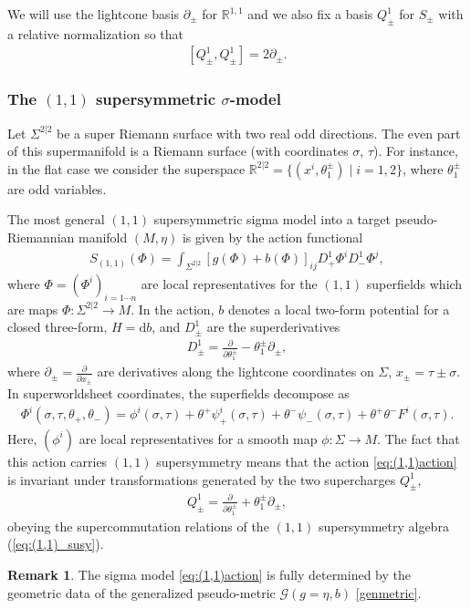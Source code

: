 \documentclass{article}
\newcommand{\GG}{\mathcal{G}}
\newcommand{\RR}{\mathbb{R}}
\newcommand{\p}{\partial}
\newcommand{\rd}{\mathrm{d}}
\theoremstyle{definition}
\newtheorem{remark}[theorem]{Remark}
\theoremstyle{remark}
\begin{document}
We will use the lightcone basis $\p_{\pm}$ for $\RR^{1,1}$ and we also fix a basis $Q_\pm^1$ for $S_{\pm}$ with a relative normalization so that
\begin{align}\label{eq:(1,1)_susy}
[Q^1_\pm,Q^1_\pm] = 2\p_\pm.
\end{align}

\subsubsection{The $(1,1)$ supersymmetric $\sigma$-model} 

Let $\Sigma^{2|2}$ be a super Riemann surface with two real odd directions. 
The even part of this supermanifold is a Riemann surface (with coordinates $\sigma$, $\tau$).
For instance, in the flat case we consider the superspace $\RR^{2|2} = \{(x^i , \theta_1^{\pm}) \; | \; i = 1,2\}$, where $\theta_1^{\pm}$ are odd variables. 

The most general $(1,1)$ supersymmetric sigma model into a target pseudo-Riemannian manifold $(M,\eta)$ is given by the action functional
\begin{align}\label{eq:(1,1)action}
S_{(1,1)}(\Phi)=\int_{\Sigma^{2|2}} [g(\Phi)+b(\Phi)]_{ij}D^1_+\Phi^iD^1_-\Phi^j,
\end{align}
where $\Phi=(\Phi^i)_{i=1\cdots n}$ are local representatives for the $(1,1)$ {superfields} which are maps $\Phi: \Sigma^{2|2} \rightarrow M$.
In the action, $b$ denotes a local two-form potential for a closed three-form, $H=\rd b$, and $D^1_\pm$ are the superderivatives
\begin{align}\label{eq:D1}
D^1_\pm=\frac{\p}{\p \theta_1^\pm}-\theta_1^\pm \p_\pm,
\end{align}
where $\p_\pm=\frac{\p}{\p x_\pm}$ are derivatives along the lightcone coordinates on $\Sigma$, $x_\pm=\tau\pm\sigma$. In superworldsheet coordinates, the superfields decompose as
\begin{align}\label{fields_(1,1)}
\Phi^i(\sigma,\tau,\theta_+,\theta_-)=\phi^i(\sigma,\tau)+\theta^+\psi^i_+(\sigma,\tau)+\theta^-\psi_-(\sigma,\tau)+\theta^+\theta^-F^i(\sigma,\tau).
\end{align}
Here, $(\phi^i)$ are local representatives for a smooth map $\phi: \Sigma \rightarrow M$. The fact that this action carries $(1,1)$ supersymmetry means that the action \eqref{eq:(1,1)action} is invariant under transformations generated by the two {supercharges} $Q^1_\pm$, 
\begin{align}\label{eq:Q1}
Q^1_\pm=\frac{\p}{\p \theta_1^\pm}+\theta_1^\pm \p_\pm,
\end{align}
obeying the supercommutation relations of the $(1,1)$ supersymmetry algebra (\ref{eq:(1,1)_susy}). 
\begin{remark}
The sigma model \eqref{eq:(1,1)action} is fully determined by the geometric data of the generalized pseudo-metric $\GG(g=\eta,b)$ \eqref{genmetric}.
\end{remark}
\end{document}
